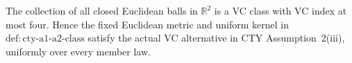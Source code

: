 The collection of all closed Euclidean balls in \(\mathbb R^2\) is a VC class with VC index at most four.  Hence the fixed Euclidean metric and uniform kernel in \(\mathrm{def:cty\text{-}a1\text{-}a2\text{-}class}\) satisfy the actual VC alternative in CTY Assumption~2(iii), uniformly over every member law.